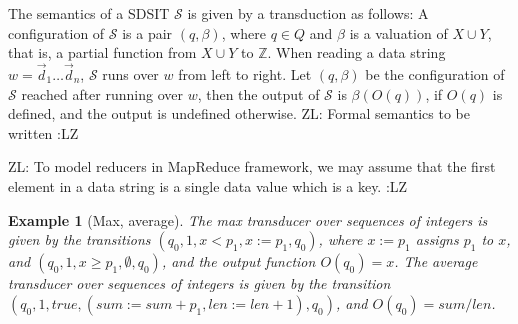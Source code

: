 \documentclass[11pt]{article}
\newtheorem{example}{Example}
\def\Ss{{\mathcal{S} }}
\def\Ii{{\mathbb{Z} }}
\newcommand{\zhilin}[1]{\color{cyan} {ZL: #1 :LZ} \color{black}}
\begin{document}
The semantics of a SDSIT $\Ss$  is given by a transduction as follows: A configuration of $\Ss$ is a pair $(q,\beta)$, where $q \in Q$ and $\beta$ is a valuation of $X \cup Y$, that is, a partial function from $X \cup Y$ to $\Ii$. When reading a data string $w=\vec{d}_1 \dots \vec{d}_n$, $\Ss$ runs over $w$ from left to right. Let $(q, \beta)$ be the configuration of $\Ss$ reached after running over $w$, then the output of $\Ss$ is $\beta(O(q))$, if $O(q)$ is defined, and the output is undefined otherwise. \zhilin{Formal semantics to be written}

\zhilin{To model reducers in MapReduce framework, we may assume that the first element in a data string is a single data value which is a key.}

\begin{example}[Max, average]
The max transducer over sequences of integers is given by the transitions $(q_0, 1, x < p_1, x:=p_1, q_0)$, where $x:= p_1$ assigns $p_1$ to $x$, and $(q_0, 1, x \ge p_1 , \emptyset, q_0)$, and the output function $O(q_0)=x$. The average transducer over sequences of integers is given by the transition $(q_0, 1, true, (sum:=sum + p_1, len := len +1), q_0)$, and $O(q_0)=sum / len$. 
\end{example}
\end{document}
